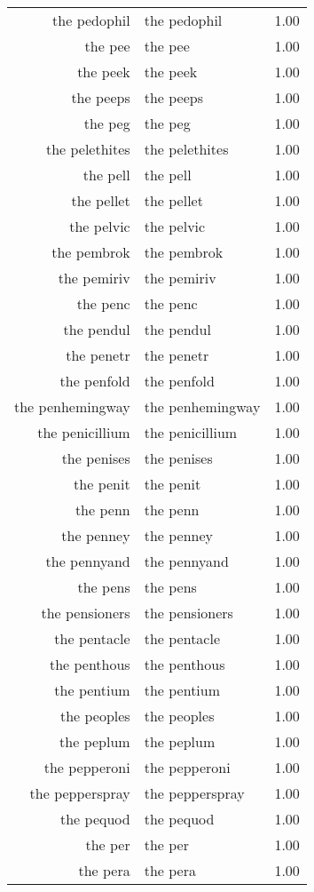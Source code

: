 \begin{table}[ht]
\begin{tabular}{rlr}
  the pedophil & the pedophil & 1.00 \\ 
  the pee & the pee & 1.00 \\ 
  the peek & the peek & 1.00 \\ 
  the peeps & the peeps & 1.00 \\ 
  the peg & the peg & 1.00 \\ 
  the pelethites & the pelethites & 1.00 \\ 
  the pell & the pell & 1.00 \\ 
  the pellet & the pellet & 1.00 \\ 
  the pelvic & the pelvic & 1.00 \\ 
  the pembrok & the pembrok & 1.00 \\ 
  the pemiriv & the pemiriv & 1.00 \\ 
  the penc & the penc & 1.00 \\ 
  the pendul & the pendul & 1.00 \\ 
  the penetr & the penetr & 1.00 \\ 
  the penfold & the penfold & 1.00 \\ 
  the penhemingway & the penhemingway & 1.00 \\ 
  the penicillium & the penicillium & 1.00 \\ 
  the penises & the penises & 1.00 \\ 
  the penit & the penit & 1.00 \\ 
  the penn & the penn & 1.00 \\ 
  the penney & the penney & 1.00 \\ 
  the pennyand & the pennyand & 1.00 \\ 
  the pens & the pens & 1.00 \\ 
  the pensioners & the pensioners & 1.00 \\ 
  the pentacle & the pentacle & 1.00 \\ 
  the penthous & the penthous & 1.00 \\ 
  the pentium & the pentium & 1.00 \\ 
  the peoples & the peoples & 1.00 \\ 
  the peplum & the peplum & 1.00 \\ 
  the pepperoni & the pepperoni & 1.00 \\ 
  the pepperspray & the pepperspray & 1.00 \\ 
  the pequod & the pequod & 1.00 \\ 
  the per & the per & 1.00 \\ 
  the pera & the pera & 1.00 \\ 

\end{tabular}
\end{table}
